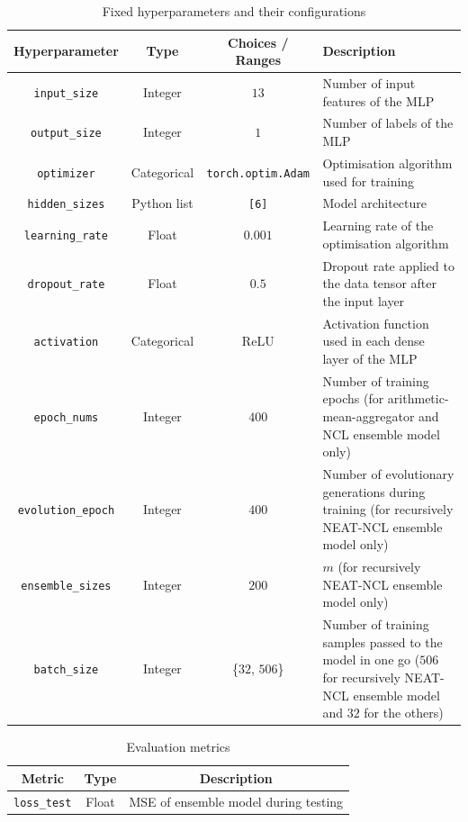 \begin{table}[H]
    \centering
    \begin{tabular}{|c|c|c|p{7cm}|}
        \hline
        Hyperparameter & Type & Choices / Ranges & Description \\
        \hline
        \small\texttt{input\_size} & Integer & $13$ & Number of input features of the MLP \\
        \hline
        \small\texttt{output\_size} & Integer & $1$ & Number of labels of the MLP \\
        \hline
        \small\texttt{optimizer} & Categorical & \texttt{torch.optim.Adam} & Optimisation algorithm used for training \\
        \hline
        \small\texttt{hidden\_sizes} & Python list & \texttt{[6]} & Model architecture \\
        \hline
        \small\texttt{learning\_rate} & Float & $0.001$ & Learning rate of the optimisation algorithm \\
        \hline
        \small\texttt{dropout\_rate} & Float & $0.5$ & Dropout rate applied to the data tensor after the input layer \\
        \hline
        \small\texttt{activation} & Categorical & ReLU & Activation function used in each dense layer of the MLP \\
        \hline
        \small\texttt{epoch\_nums} & Integer & $400$ & Number of training epochs (for arithmetic-mean-aggregator and NCL ensemble model only) \\
        \hline
        \small\texttt{evolution\_epoch} & Integer & $400$ & Number of evolutionary generations during training (for recursively NEAT-NCL ensemble model only) \\
        \hline
        \small\texttt{ensemble\_sizes} & Integer & $200$ & $m$ (for recursively NEAT-NCL ensemble model only) \\
        \hline
        \small\texttt{batch\_size} & Integer & \{$32$, $506$\} & Number of training samples passed to the model in one go ($506$ for recursively NEAT-NCL ensemble model and $32$ for the others) \\
        \hline
    \end{tabular}
    \caption{Fixed hyperparameters and their configurations}
    \label{table:experiment_6_fixed_hyperparameters}
\end{table}

\begin{table}[H]
    \centering
    \begin{tabular}{|c|c|c|}
        \hline
        Metric & Type & Description \\
        \hline
        \small\texttt{loss\_test} & Float & MSE of ensemble model during testing \\
        \hline
    \end{tabular}
    \caption{Evaluation metrics}
    \label{table:experiment_6_metric}
\end{table}